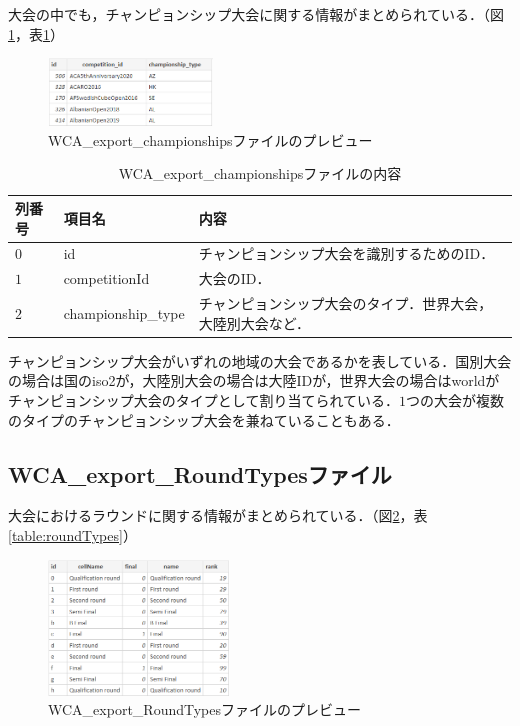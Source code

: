 \documentclass{article}
\begin{document}
  大会の中でも，チャンピョンシップ大会に関する情報がまとめられている．（図\ref{figure:championships}，表\ref{table:championships}）\par

  \begin{figure}[h]
    \centering
    \includegraphics[height=18mm]{championships.png}
    \caption{WCA\_export\_championshipsファイルのプレビュー}
    \label{figure:championships}
  \end{figure}

  \begin{table}[h]
    \centering
    \caption{WCA\_export\_championshipsファイルの内容}
    \label{table:championships}
    \begin{tabular}{l|l|l}
      \hline
      列番号 & 項目名 & 内容 \\
      \hline \hline
      $ 0 $ & id & チャンピョンシップ大会を識別するためのID． \\
      $ 1 $ & competitionId & 大会のID． \\
      $ 2 $ & championship\_type & チャンピョンシップ大会のタイプ．世界大会，大陸別大会など． \\
      \hline
    \end{tabular}
  \end{table}

  チャンピョンシップ大会がいずれの地域の大会であるかを表している．国別大会の場合は国のiso2が，大陸別大会の場合は大陸IDが，世界大会の場合はworldがチャンピョンシップ大会のタイプとして割り当てられている．$ 1 $つの大会が複数のタイプのチャンピョンシップ大会を兼ねていることもある．\par

  \subsection{WCA\_export\_RoundTypesファイル}

  大会におけるラウンドに関する情報がまとめられている．（図\ref{figure:roundTypes}，表\ref{table:roundTypes}）\par

  \begin{figure}[h]
    \centering
    \includegraphics[height=36mm]{roundTypes.png}
    \caption{WCA\_export\_RoundTypesファイルのプレビュー}
    \label{figure:roundTypes}
  \end{figure}
\end{document}

